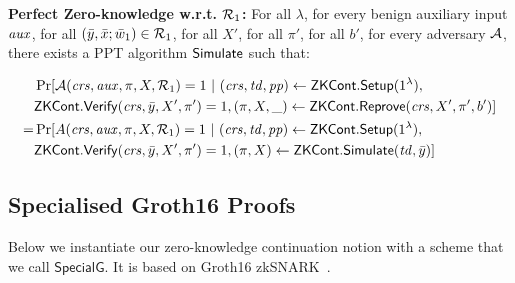 \begin{definition}[ZK Continuation]
\noindent \textbf{Perfect Zero-knowledge w.r.t. $\mathcal{R}_1$:} For all $\lambda$, for every benign auxiliary input $\mathit{aux}$, 
for all  $(\bar{y}, \bar{x}; \bar{w}_1) \in \mathcal{R}_1$, for all $X'$, for all $\pi'$, for all $b'$, for every adversary $\mathcal{A}$, there exists a PPT algorithm $ {\mathsf{Simulate}} $ such that:
\begin{footnotesize}
\begin{align*}
& \Pr [\mathcal{A}(\mathit{crs}, \mathit{aux}, \pi, X, \mathcal{R}_1) = 1 \ | \ (\mathit{crs}, \mathit{td}, \mathit{pp}) \leftarrow {\ensuremath{\mathsf{ZKCont}}}.{\mathsf{Setup}} (1^{\lambda}), 
\\& {\mathsf{ZKCont}}.{\mathsf{Verify}}(\mathit{crs}, \bar{y}, X', \pi') = 1,  (\pi, X, \_) \leftarrow {\ensuremath{\mathsf{ZKCont}}}.{\mathsf{Reprove}} (\mathit{crs}, X', \pi', b')] \\
= & \Pr[A(\mathit{crs}, \mathit{aux}, \pi, X, \mathcal{R}_1) = 1 \ | \ (\mathit{crs}, \mathit{td}, \mathit{pp}) \leftarrow {\ensuremath{\mathsf{ZKCont}}}.{\mathsf{Setup}} (1^{\lambda}), \\ 
                        & {\mathsf{ZKCont}}.{\mathsf{Verify}}(\mathit{crs}, \bar{y}, X', \pi') = 1,  (\pi, X) \leftarrow {\ensuremath{\mathsf{ZKCont}}}.{\mathsf{Simulate}}(\mathit{td}, \bar{y})]
\end{align*}

\end{footnotesize}


\end{definition} 


\subsection{Specialised Groth16 Proofs}
\label{sec:rvrf_groth16}

Below we instantiate our zero-knowledge continuation notion with a scheme that we call  \emph{$\mathsf{SpecialG}$}. It is based on Groth16 zkSNARK~\cite{Groth16}.

